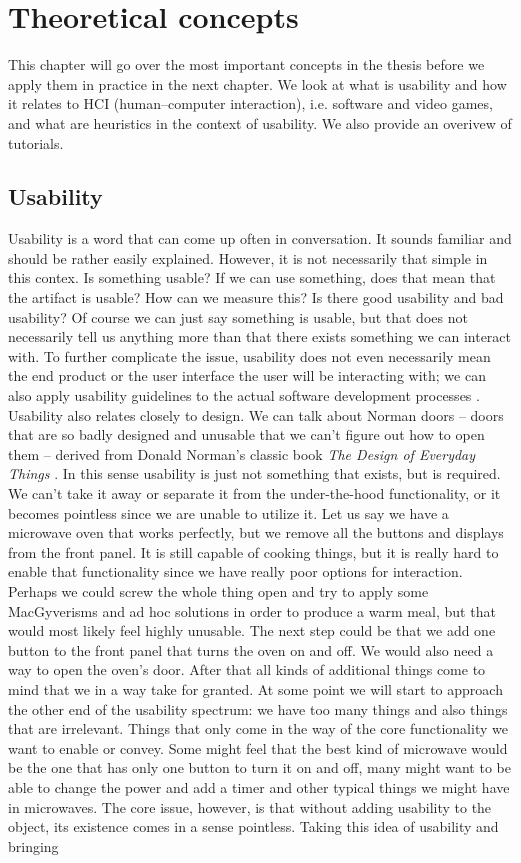 \chapter{Theoretical concepts}

This chapter will go over the most important concepts in the thesis before we apply them in practice in the next chapter. We look at what is usability and how it relates to HCI (human--computer interaction), i.e. software and video games, and what are heuristics in the context of usability. We also provide an overivew of tutorials.

\section{Usability}
Usability is a word that can come up often in conversation. It sounds familiar and should be rather easily explained. However, it is not necessarily that simple in this contex. Is something usable? If we can use something, does that mean that the artifact is usable? How can we measure this? Is there good usability and bad usability? Of course we can just say something is usable, but that does not necessarily tell us anything more than that there exists something we can interact with. To further complicate the issue, usability does not even necessarily mean the end product or the user interface the user will be interacting with; we can also apply usability guidelines to the actual software development processes \cite{Carvajal2013}. Usability also relates closely to design. We can talk about Norman doors -- doors that are so badly designed and unusable that we can't figure out how to open them -- derived from Donald Norman's classic book \textit{The Design of Everyday Things} \cite{Norman2013a}. In this sense usability is just not something that exists, but is required. We can't take it away or separate it from the under-the-hood functionality, or it becomes pointless since we are unable to utilize it. Let us say we have a microwave oven that works perfectly, but we remove all the buttons and displays from the front panel. It is still capable of cooking things, but it is really hard to enable that functionality since we have really poor options for interaction. Perhaps we could screw the whole thing open and try to apply some MacGyverisms and ad hoc solutions in order to produce a warm meal, but that would most likely feel highly unusable. The next step could be that we add one button to the front panel that turns the oven on and off. We would also need a way to open the oven's door. After that all kinds of additional things come to mind that we in a way take for granted. At some point we will start to approach the other end of the usability spectrum: we have too many things and also things that are irrelevant. Things that only come in the way of the core functionality we want to enable or convey. Some might feel that the best kind of microwave would be the one that has only one button to turn it on and off, many might want to be able to change the power and add a timer and other typical things we might have in microwaves. The core issue, however, is that without adding usability to the object, its existence comes in a sense pointless. Taking this idea of usability and bringing 